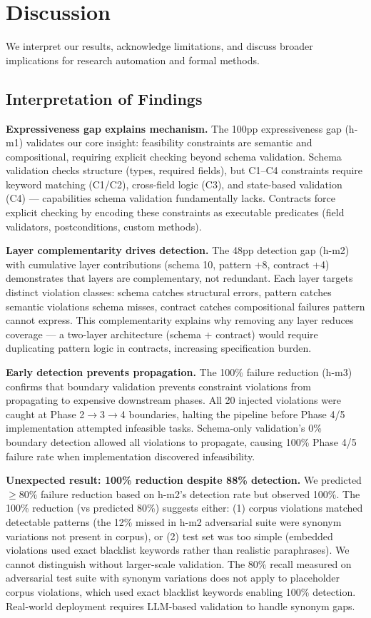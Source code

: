 \section{Discussion}

We interpret our results, acknowledge limitations, and discuss broader implications for research automation and formal methods.

\subsection{Interpretation of Findings}

\textbf{Expressiveness gap explains mechanism.} The 100pp expressiveness gap (h-m1) validates our core insight: feasibility constraints are semantic and compositional, requiring explicit checking beyond schema validation. Schema validation checks structure (types, required fields), but C1--C4 constraints require keyword matching (C1/C2), cross-field logic (C3), and state-based validation (C4) --- capabilities schema validation fundamentally lacks. Contracts force explicit checking by encoding these constraints as executable predicates (field validators, postconditions, custom methods).

\textbf{Layer complementarity drives detection.} The 48pp detection gap (h-m2) with cumulative layer contributions (schema 10, pattern +8, contract +4) demonstrates that layers are complementary, not redundant. Each layer targets distinct violation classes: schema catches structural errors, pattern catches semantic violations schema misses, contract catches compositional failures pattern cannot express. This complementarity explains why removing any layer reduces coverage --- a two-layer architecture (schema + contract) would require duplicating pattern logic in contracts, increasing specification burden.

\textbf{Early detection prevents propagation.} The 100\% failure reduction (h-m3) confirms that boundary validation prevents constraint violations from propagating to expensive downstream phases. All 20 injected violations were caught at Phase 2$\rightarrow$3$\rightarrow$4 boundaries, halting the pipeline before Phase 4/5 implementation attempted infeasible tasks. Schema-only validation's 0\% boundary detection allowed all violations to propagate, causing 100\% Phase 4/5 failure rate when implementation discovered infeasibility.

\textbf{Unexpected result: 100\% reduction despite 88\% detection.} We predicted $\geq$80\% failure reduction based on h-m2's detection rate but observed 100\%. The 100\% reduction (vs predicted 80\%) suggests either: (1) corpus violations matched detectable patterns (the 12\% missed in h-m2 adversarial suite were synonym variations not present in corpus), or (2) test set was too simple (embedded violations used exact blacklist keywords rather than realistic paraphrases). We cannot distinguish without larger-scale validation. The 80\% recall measured on adversarial test suite with synonym variations does not apply to placeholder corpus violations, which used exact blacklist keywords enabling 100\% detection. Real-world deployment requires LLM-based validation to handle synonym gaps.

